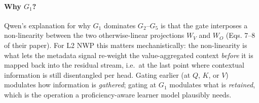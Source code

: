 \paragraph{Why $G_1$?}
Qwen's explanation for why $G_1$ dominates $G_2$--$G_5$ is that the
gate interposes a non-linearity between the two otherwise-linear
projections $W_V$ and $W_O$ (Eqs. 7--8 of their paper). For L2 NWP this
matters mechanistically: the non-linearity is what lets the metadata
signal re-weight the value-aggregated context \emph{before} it is mapped
back into the residual stream, i.e.~at the last point where contextual
information is still disentangled per head. Gating earlier (at $Q$, $K$,
or $V$) modulates how information is \emph{gathered}; gating at $G_1$
modulates what is \emph{retained}, which is the operation a
proficiency-aware learner model plausibly needs.
